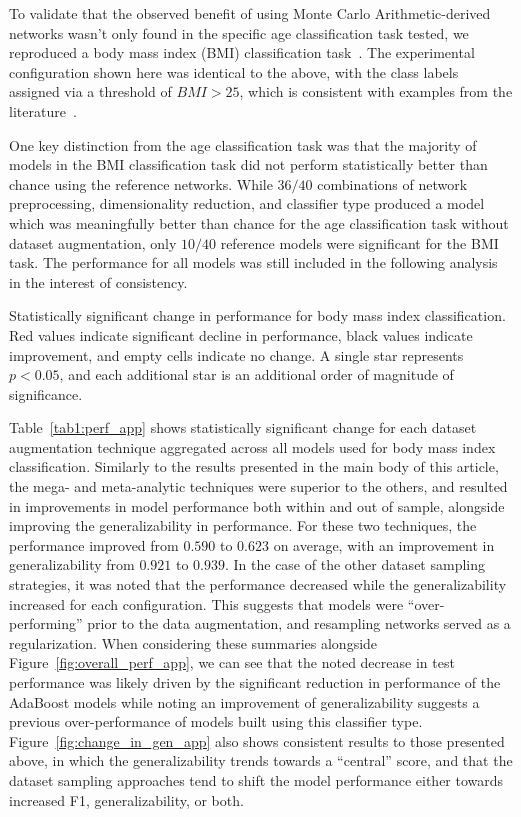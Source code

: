 \documentclass[num-refs]{nbdt-article}
\begin{document}
To validate that the observed benefit of using Monte Carlo Arithmetic-derived networks wasn't only found in the specific age classification task tested, we reproduced a body mass index (BMI) classification task~\cite{Park2015-uj}. The experimental configuration shown here was identical to the above, with the class labels assigned via a threshold of $BMI > 25$, which is consistent with examples from the literature~\cite{Park2015-uj}.

One key distinction from the age classification task was that the majority of models in the BMI classification task did not perform statistically better than chance using the reference networks. While $36/40$ combinations of network preprocessing, dimensionality reduction, and classifier type produced a model which was meaningfully better than chance for the age classification task without dataset augmentation, only $10/40$ reference models were significant for the BMI task. The performance for all models was still included in the following analysis in the interest of consistency.

\begin{table}[h!]
\centering
\caption{Statistically significant change in performance for body mass index classification. Red values indicate
significant decline in performance, black values indicate improvement, and empty cells indicate no change. A single
star represents $p < 0.05$, and each additional star is an additional order of magnitude of significance.}
\label{tab1:perf_app}
\small

\end{table}

Table~\ref{tab1:perf_app} shows statistically significant change for each dataset augmentation technique aggregated across all models used for body mass index classification. Similarly to the results presented in the main body of this article, the mega- and meta-analytic techniques were superior to the others, and resulted in improvements in model performance both within and out of sample, alongside improving the generalizability in performance. For these two techniques, the performance improved from $0.590$ to $0.623$ on average, with an improvement in generalizability from $0.921$ to $0.939$. In the case of the other dataset sampling strategies, it was noted that the performance decreased while the generalizability increased for each configuration. This suggests that models were ``over-performing'' prior to the data augmentation, and resampling networks served as a regularization. When considering these summaries alongside Figure~\ref{fig:overall_perf_app}, we can see that the noted decrease in test performance was likely driven by the significant reduction in performance of the AdaBoost models while noting an improvement of generalizability suggests a previous over-performance of models built using this classifier type. Figure~\ref{fig:change_in_gen_app} also shows consistent results to those presented above, in which the generalizability trends towards a ``central'' score, and that the dataset sampling approaches tend to shift the model performance either towards increased F1, generalizability, or both.
\end{document}

